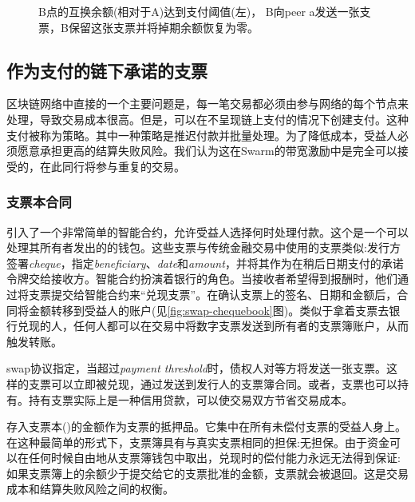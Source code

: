 \begin{center}
\begin{figure}[htbp]

\caption[支票交换\statusgreen]{B点的互换余额(相对于A)达到支付阈值(左)，
B向peer a发送一张支票，B保留这张支票并将掉期余额恢复为零。}
\label{fig:chequeswap}
\end{figure}
\end{center}

\subsection{作为支付的链下承诺的支票\statusgreen}\label{sec:cheques}

区块链网络中直接的一个主要问题是，每一笔交易都必须由参与网络的每个节点来处理，导致交易成本很高。但是，可以在不呈现链上支付的情况下创建支付。这种支付被称为策略。其中一种策略是推迟付款并批量处理。为了降低成本，受益人必须愿意承担更高的结算失败风险。我们认为这在Swarm的带宽激励中是完全可以接受的，在此同行将参与重复的交易。


\subsubsection{支票本合同}

\cite{ethersphere2016sw3}引入了一个非常简单的智能合约，允许受益人选择何时处理付款。这个是一个可以处理其所有者发出的的钱包。这些支票与传统金融交易中使用的支票类似:发行方签署\emph{cheque}，指定\emph{beneficiary}、\emph{date}和\emph{amount}，并将其作为在稍后日期支付的承诺令牌交给接收方。智能合约扮演着银行的角色。当接收者希望得到报酬时，他们通过将支票提交给智能合约来“兑现支票”。在确认支票上的签名、日期和金额后，合同将金额转移到受益人的账户(见\ref{fig:swap-chequebook}图)。类似于拿着支票去银行兑现的人，任何人都可以在交易中将数字支票发送到所有者的支票簿账户，从而触发转账。 

swap协议指定，当超过\emph{payment threshold}时，债权人对等方将发送一张支票。这样的支票可以立即被兑现，通过发送到发行人的支票簿合同。或者，支票也可以持有。持有支票实际上是一种信用贷款，可以使交易双方节省交易成本。 

存入支票本()的金额作为支票的抵押品。它集中在所有未偿付支票的受益人身上。在这种最简单的形式下，支票簿具有与真实支票相同的担保:无担保。由于资金可以在任何时候自由地从支票簿钱包中取出，兑现时的偿付能力永远无法得到保证:如果支票簿上的余额少于提交给它的支票批准的金额，支票就会被退回。这是交易成本和结算失败风险之间的权衡。

